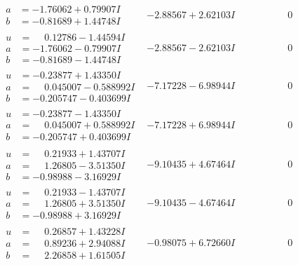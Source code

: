 \documentclass[1p]{elsarticle_modified}
\theoremstyle{definition}
\begin{document}
$$\begin{array}{c|c|c}
\begin{aligned}
a &= -1.76062 + 0.79907 I \\
b &= -0.81689 + 1.44748 I\end{aligned}
 & -2.88567 + 2.62103 I & \phantom{-0.000000 } 0 \\ \hline\begin{aligned}
u &= \phantom{-}0.12786 - 1.44594 I \\
a &= -1.76062 - 0.79907 I \\
b &= -0.81689 - 1.44748 I\end{aligned}
 & -2.88567 - 2.62103 I & \phantom{-0.000000 } 0 \\ \hline\begin{aligned}
u &= -0.23877 + 1.43350 I \\
a &= \phantom{-}0.045007 - 0.588992 I \\
b &= -0.205747 - 0.403699 I\end{aligned}
 & -7.17228 - 6.98944 I & \phantom{-0.000000 } 0 \\ \hline\begin{aligned}
u &= -0.23877 - 1.43350 I \\
a &= \phantom{-}0.045007 + 0.588992 I \\
b &= -0.205747 + 0.403699 I\end{aligned}
 & -7.17228 + 6.98944 I & \phantom{-0.000000 } 0 \\ \hline\begin{aligned}
u &= \phantom{-}0.21933 + 1.43707 I \\
a &= \phantom{-}1.26805 - 3.51350 I \\
b &= -0.98988 - 3.16929 I\end{aligned}
 & -9.10435 + 4.67464 I & \phantom{-0.000000 } 0 \\ \hline\begin{aligned}
u &= \phantom{-}0.21933 - 1.43707 I \\
a &= \phantom{-}1.26805 + 3.51350 I \\
b &= -0.98988 + 3.16929 I\end{aligned}
 & -9.10435 - 4.67464 I & \phantom{-0.000000 } 0 \\ \hline\begin{aligned}
u &= \phantom{-}0.26857 + 1.43228 I \\
a &= \phantom{-}0.89236 + 2.94088 I \\
b &= \phantom{-}2.26858 + 1.61505 I\end{aligned}
 & -0.98075 + 6.72660 I & \phantom{-0.000000 } 0 \\ \hline\begin{aligned}

\end{aligned}
\end{array}$$
\end{document}
